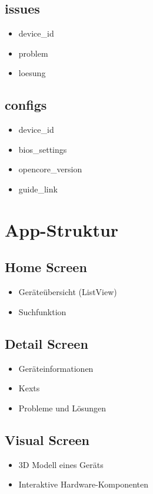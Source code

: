 \documentclass[a4paper,12pt]{article}
\begin{document}
\subsection{issues}
\begin{itemize}
\item device\_id
\item problem
\item loesung
\end{itemize}

\subsection{configs}
\begin{itemize}
\item device\_id
\item bios\_settings
\item opencore\_version
\item guide\_link
\end{itemize}

\section{App-Struktur}

\subsection{Home Screen}
\begin{itemize}
\item Geräteübersicht (ListView)
\item Suchfunktion
\end{itemize}

\subsection{Detail Screen}
\begin{itemize}
\item Geräteinformationen
\item Kexts
\item Probleme und Lösungen
\end{itemize}

\subsection{Visual Screen}
\begin{itemize}
\item 3D Modell eines Geräts
\item Interaktive Hardware-Komponenten
\end{itemize}
\end{document}
